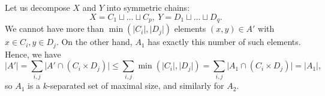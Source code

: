 \documentclass[11pt, reqno]{amsart}
\theoremstyle{remark}
\numberwithin{equation}{section}
\begin{document}
Let us decompose $X$ and $Y$ into symmetric chains:
\begin{equation*}
    X = C_1 \sqcup \ldots \sqcup C_p, \ Y = D_1 \sqcup \ldots \sqcup D_q.
\end{equation*}
We cannot have more than $\min(\vert C_i\vert , \vert D_j\vert )$ elements $(x, y) \in A'$ with $x \in C_i, y \in D_j$. On the other hand, $A_1$ has exactly this number of such elements. Hence, we have
\begin{equation}
    \vert A'\vert = \sum_{i, j} \vert A' \cap (C_i \times D_j)\vert  \leqslant \sum_{i, j} \min(\vert C_i\vert , \vert D_j\vert ) =  \sum_{i, j} \vert A_1 \cap (C_i \times D_j)\vert  = \vert A_1\vert ,
\end{equation}
so $A_1$ is a $k$-separated set of maximal size, and similarly for $A_2$.


\nocite{*}

\end{document}
